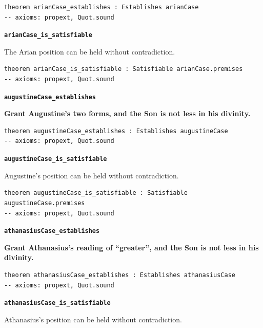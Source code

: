 \documentclass[11pt,paper=\testimonypaper,DIV=13,parskip=false]{scrartcl}
\begin{document}
{\small\begin{verbatim}
theorem arianCase_establishes : Establishes arianCase
-- axioms: propext, Quot.sound
\end{verbatim}}
\par\medskip\noindent\textbf{\texttt{arian\allowbreak{}Case\_\allowbreak{}is\_\allowbreak{}satisfiable}}\par\nobreak\noindent
The Arian position can be held without contradiction.

{\small\begin{verbatim}
theorem arianCase_is_satisfiable : Satisfiable arianCase.premises
-- axioms: propext, Quot.sound
\end{verbatim}}
\par\medskip\noindent\textbf{\texttt{augustine\allowbreak{}Case\_\allowbreak{}establishes}}\par\nobreak\noindent
\textbf{Grant Augustine’s two forms, and the Son is not less in his divinity.}

{\small\begin{verbatim}
theorem augustineCase_establishes : Establishes augustineCase
-- axioms: propext, Quot.sound
\end{verbatim}}
\par\medskip\noindent\textbf{\texttt{augustine\allowbreak{}Case\_\allowbreak{}is\_\allowbreak{}satisfiable}}\par\nobreak\noindent
Augustine’s position can be held without contradiction.

{\small\begin{verbatim}
theorem augustineCase_is_satisfiable : Satisfiable augustineCase.premises
-- axioms: propext, Quot.sound
\end{verbatim}}
\par\medskip\noindent\textbf{\texttt{athanasius\allowbreak{}Case\_\allowbreak{}establishes}}\par\nobreak\noindent
\textbf{Grant Athanasius’s reading of “greater”, and the Son is not less in his divinity.}

{\small\begin{verbatim}
theorem athanasiusCase_establishes : Establishes athanasiusCase
-- axioms: propext, Quot.sound
\end{verbatim}}
\par\medskip\noindent\textbf{\texttt{athanasius\allowbreak{}Case\_\allowbreak{}is\_\allowbreak{}satisfiable}}\par\nobreak\noindent
Athanasius’s position can be held without contradiction.
\end{document}
